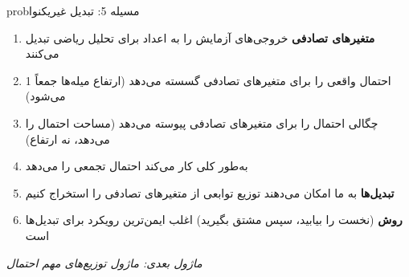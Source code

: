 \begin{PSbox}[unbreakable]{prob}{مسیله 5: تبدیل غیریکنوا}
\begin{Shaded}
\begin{Highlighting}[]
 \OperatorTok{=} \OperatorTok{;}
 \OperatorTok{=} \OperatorTok{*}\NormalTok{(}\OperatorTok{,}\NormalTok{) }\OperatorTok{{-}} \OperatorTok{;}   
 \OperatorTok{=} \OperatorTok{;}
\NormalTok{(}\OperatorTok{,} \OperatorTok{,} \OperatorTok{,} \NormalTok{)}\OperatorTok{;}
 \OperatorTok{;}
 \OperatorTok{=} \NormalTok{(}\OperatorTok{,} \OperatorTok{,} \NormalTok{)}\OperatorTok{;}
\NormalTok{(}\OperatorTok{,} \NormalTok{(}\OperatorTok{*}\NormalTok{(}\NormalTok{))}\OperatorTok{,} \OperatorTok{,} \OperatorTok{,} \NormalTok{)}\OperatorTok{;}
\NormalTok{(}\OperatorTok{,} \NormalTok{)}\OperatorTok{;}
\NormalTok{(}\NormalTok{)}\OperatorTok{;} \NormalTok{(}\NormalTok{)}\OperatorTok{;}
\end{Highlighting}
\end{Shaded}

\end{PSbox}


\begin{enumerate}
\def\labelenumi{\arabic{enumi}.}
\tightlist
\item
  \textbf{متغیرهای تصادفی} خروجی‌های آزمایش را به اعداد برای تحلیل ریاضی تبدیل می‌کنند
\item
   احتمال واقعی را برای متغیرهای تصادفی گسسته می‌دهد (ارتفاع میله‌ها جمعاً 1 می‌شود)
\item
   چگالی احتمال را برای متغیرهای تصادفی پیوسته می‌دهد (مساحت احتمال را می‌دهد، نه ارتفاع)
\item
   به‌طور کلی کار می‌کند  احتمال تجمعی  را می‌دهد
\item
  \textbf{تبدیل‌ها} به ما امکان می‌دهند توزیع توابعی از متغیرهای تصادفی را استخراج کنیم
\item
  \textbf{روش } (نخست  را بیابید، سپس مشتق بگیرید) اغلب ایمن‌ترین رویکرد برای تبدیل‌ها است
\end{enumerate}

\emph{ماژول بعدی: {ماژول  توزیع‌های مهم احتمال}}\PSbr{}
